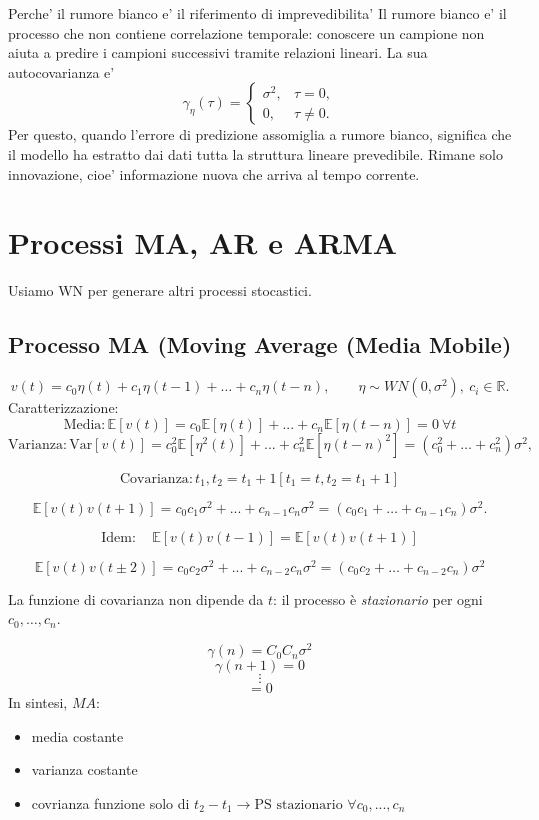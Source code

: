 \documentclass[11pt,a4paper]{article}
\begin{document}
\begin{spiegazione}{Perche' il rumore bianco e' il riferimento di imprevedibilita'}
Il rumore bianco e' il processo che non contiene correlazione temporale: conoscere un campione non aiuta a predire i campioni successivi tramite relazioni lineari. La sua autocovarianza e'
\[
\gamma_\eta(\tau)=
\begin{cases}
\sigma^2, & \tau=0,\\
0, & \tau\neq 0.
\end{cases}
\]
Per questo, quando l'errore di predizione assomiglia a rumore bianco, significa che il modello ha estratto dai dati tutta la struttura lineare prevedibile. Rimane solo innovazione, cioe' informazione nuova che arriva al tempo corrente.
\end{spiegazione}

\section{Processi MA, AR e ARMA}
Usiamo WN per generare altri processi stocastici.
\subsection{Processo MA (Moving Average (Media Mobile)}
\[
v(t)=c_0\eta(t)+c_1\eta(t-1)+\dots+c_n\eta(t-n),\qquad \eta\sim WN(0,\sigma^2),\ c_i\in\mathbb{R}.
\]
Caratterizzazione:
\[
\text{Media}: \mathbb{E}[v(t)]= c_0\mathbb{E}[\eta(t)]+...+c_n\mathbb{E}[\eta(t-n)] = 0 \ \forall t
\]
\[\text{Varianza}: \mathrm{Var}[v(t)]= c_0^2\mathbb{E}[\eta^2(t)]+...+c_n^2\mathbb{E}[\eta(t-n)^2]= (c_0^2+\dots+c_n^2)\sigma^2,
\]

\[
\text{Covarianza}: t_1, t_2 = t_1+1 [t_1 = t, t_2 = t_1 +1] 
\]

\[
\mathbb{E}[v(t)v(t+1)]= c_0c_1\sigma^2 + ...+c_{n-1}c_n\sigma^2=(c_0 c_1+\dots+c_{n-1}c_n)\sigma^2.
\]

\[
\text{Idem}: \quad \mathbb{E}[v(t)v(t-1)] = \mathbb{E}[v(t)v(t+1)]
\]

\[
\mathbb{E}[v(t)v(t\pm2)] = c_0c_2\sigma^2 + ...+c_{n-2}c_n\sigma^2 = (c_0 c_2+\dots+c_{n-2}c_n)\sigma^2
\]

La funzione di covarianza non dipende da $t$: il processo è \emph{stazionario} per ogni $c_0,\dots,c_n$.

\[
\gamma(n)=C_0C_n\sigma^2
\]
\[
\gamma(n+1)=0
\]
\[
\vdots
\]
\[
=0
\]
\newpage
In sintesi, $MA$: 
\begin{itemize}
    \item media costante
    \item varianza costante
    \item covrianza funzione solo di $t_2-t_1 \rightarrow \text{PS stazionario }\forall c_0,...,c_n$
\end{itemize}
\end{document}

